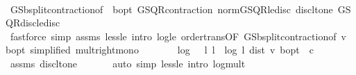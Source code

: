 \begin{isabellebody}
\ \ \ \ \isamarkupfalse%
\ GS{\isachardot}{\kern0pt}{\isasymL}\isactrlsub b{\isacharunderscore}{\kern0pt}split{\isacharunderscore}{\kern0pt}contraction{\isacharbrackleft}{\kern0pt}of\ {\isacharunderscore}{\kern0pt}\ {\isachardoublequoteopen}{\isasymnu}\isactrlsub b{\isacharunderscore}{\kern0pt}opt{\isachardoublequoteclose}{\isacharbrackright}{\kern0pt}\ GS{\isachardot}{\kern0pt}QR{\isacharunderscore}{\kern0pt}contraction\ norm{\isacharunderscore}{\kern0pt}GS{\isacharunderscore}{\kern0pt}QR{\isacharunderscore}{\kern0pt}le{\isacharunderscore}{\kern0pt}disc\ disc{\isacharunderscore}{\kern0pt}lt{\isacharunderscore}{\kern0pt}one\ GS{\isacharunderscore}{\kern0pt}QR{\isacharunderscore}{\kern0pt}disc{\isacharunderscore}{\kern0pt}le{\isacharunderscore}{\kern0pt}disc\isanewline
\ \ \ \ \isamarkupfalse%
\ {\isacharparenleft}{\kern0pt}fastforce\ simp{\isacharcolon}{\kern0pt}\ assms\ less{\isacharunderscore}{\kern0pt}le\ intro{\isacharbang}{\kern0pt}{\isacharcolon}{\kern0pt}\ log{\isacharunderscore}{\kern0pt}le\ order{\isachardot}{\kern0pt}trans{\isacharbrackleft}{\kern0pt}OF\ GS{\isachardot}{\kern0pt}{\isasymL}\isactrlsub b{\isacharunderscore}{\kern0pt}split{\isacharunderscore}{\kern0pt}contraction{\isacharbrackleft}{\kern0pt}of\ v\ {\isachardoublequoteopen}{\isasymnu}\isactrlsub b{\isacharunderscore}{\kern0pt}opt{\isachardoublequoteclose}{\isacharcomma}{\kern0pt}\ simplified{\isacharbrackright}{\kern0pt}{\isacharbrackright}{\kern0pt}\ mult{\isacharunderscore}{\kern0pt}right{\isacharunderscore}{\kern0pt}mono{\isacharparenright}{\kern0pt}\isanewline
\ \ \isamarkupfalse%
\ \isamarkupfalse%
\ {\isachardoublequoteopen}{\isasymdots}\ {\isacharequal}{\kern0pt}\ log\ {\isacharparenleft}{\kern0pt}{}\ {\isacharslash}{\kern0pt}\ l{\isacharparenright}{\kern0pt}\ l\ {\isacharplus}{\kern0pt}\ log\ {\isacharparenleft}{\kern0pt}{}{\isacharslash}{\kern0pt}l{\isacharparenright}{\kern0pt}\ {\isacharparenleft}{\kern0pt}dist\ v\ {\isasymnu}\isactrlsub b{\isacharunderscore}{\kern0pt}opt{\isacharparenright}{\kern0pt}\ {\isacharminus}{\kern0pt}\ c{\isachardoublequoteclose}\isanewline
\ \ \ \ \isamarkupfalse%
\ assms\ disc{\isacharunderscore}{\kern0pt}lt{\isacharunderscore}{\kern0pt}one\ \isanewline
\ \ \ \ \isamarkupfalse%
\ {\isacharparenleft}{\kern0pt}auto\ simp{\isacharcolon}{\kern0pt}\ less{\isacharunderscore}{\kern0pt}le\ intro{\isacharbang}{\kern0pt}{\isacharcolon}{\kern0pt}\ log{\isacharunderscore}{\kern0pt}mult{\isacharparenright}{\kern0pt}\isanewline
\ \ \isamarkupfalse%

\end{isabellebody}

